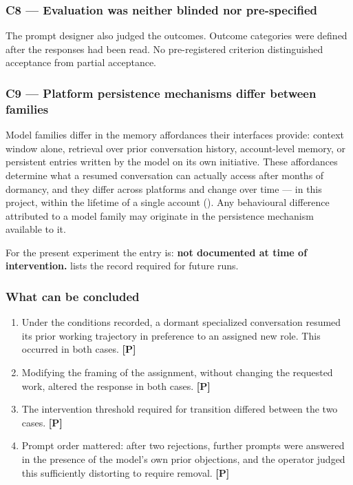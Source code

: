 \subsubsection*{C8 — Evaluation was neither blinded nor pre-specified}
\label{sec:en:x-c8-evaluation-was-neither-blinded-nor-pr}

The prompt designer also judged the outcomes. Outcome categories were defined after the responses had been read. No pre-registered criterion distinguished acceptance from partial acceptance.


\subsubsection*{C9 — Platform persistence mechanisms differ between families}
\label{sec:en:x-c9-platform-persistence-mechanisms-diffe}

Model families differ in the memory affordances their interfaces provide: context window alone, retrieval over prior conversation history, account-level memory, or persistent entries written by the model on its own initiative. These affordances determine what a resumed conversation can actually access after months of dormancy, and they differ across platforms and change over time — in this project, within the lifetime of a single account (). Any behavioural difference attributed to a model family may originate in the persistence mechanism available to it.

For the present experiment the entry is: \textbf{not documented at time of intervention.}  lists the record required for future runs.


\subsubsection*{What can be concluded}
\label{sec:en:x-what-can-be-concluded}

\begin{enumerate}
  \item Under the conditions recorded, a dormant specialized conversation resumed its prior working trajectory in preference to an assigned new role. This occurred in both cases. \textbf{[P]}
  \item Modifying the framing of the assignment, without changing the requested work, altered the response in both cases. \textbf{[P]}
  \item The intervention threshold required for transition differed between the two cases. \textbf{[P]}
  \item Prompt order mattered: after two rejections, further prompts were answered in the presence of the model's own prior objections, and the operator judged this sufficiently distorting to require removal. \textbf{[P]}
\end{enumerate}

